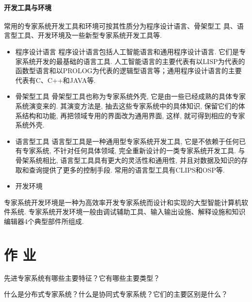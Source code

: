 \paragraph{开发工具与环境}
常用的专家系统开发工具和环境可按其性质分为程序设计语言、骨架型工 具、语言型工具、开发环境及一些新型专家系统开发工具等.
\begin{itemize}
\item 程序设计语言
    程序设计语言包括人工智能语言和通用程序设计语言. 它们是专家系统开发的最基础的语言工具. 人工智能语言的主要代表有以LISP为代表的函数型语言和以PROLOG为代表的逻辑型语言等；通用程序设计语言的主要代表有C、C++和JAVA等.
\item 骨架型工具
    骨架型工具也称为专家系统外壳, 它是由一些已经成熟的具体专家系统演变来的. 其演变方法是, 抽去这些专家系统中的具体知识, 保留它们的体系结构和功能, 再把领域专用的界面改为通用界面, 这样, 就可得到相应的专家系统外壳.
\item 语言型工具
    语言型工具是一种通用型专家系统开发工具, 它是不依赖于任何已有专家系统, 不针对任何具体领域, 完全重新设计的一类专家系统开发工具. 与骨架系统相比, 语言型工具具有更大的灵活性和通用性, 并且对数据及知识的存取和查询提供了更多的控制手段. 常用的语言型工具有CLIPS和OSP等.
\item 开发环境
\end{itemize}
    专家系统开发环境是一种为高效率开发专家系统而设计和实现的大型智能计算机软件系统. 专家系统开发环境一般由调试辅助工具、输入输出设施、解释设施和知识编辑器4个典型部件所组成.

\section{作 业}
\begin{think}
先进专家系统有哪些主要特征？它有哪些主要类型？
\end{think}
\begin{think}
什么是分布式专家系统？什么是协同式专家系统？它们的主要区别是什么？
\end{think}
